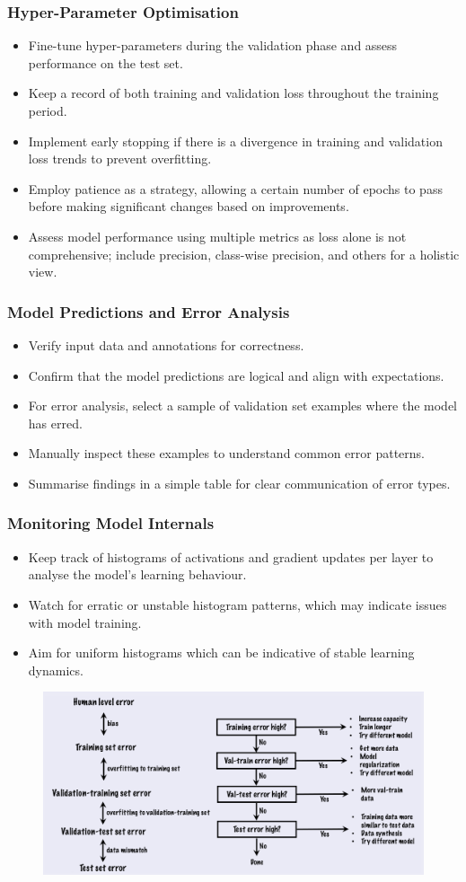 \subsubsection*{Hyper-Parameter Optimisation}
\begin{itemize}
    \item Fine-tune hyper-parameters during the validation phase and assess performance on the test set.
    \item Keep a record of both training and validation loss throughout the training period.
    \item Implement early stopping if there is a divergence in training and validation loss trends to prevent overfitting.
    \item Employ patience as a strategy, allowing a certain number of epochs to pass before making significant changes based on improvements.
    \item Assess model performance using multiple metrics as loss alone is not comprehensive; include precision, class-wise precision, and others for a holistic view.
\end{itemize}

\subsubsection*{Model Predictions and Error Analysis}
\begin{itemize}
    \item Verify input data and annotations for correctness.
    \item Confirm that the model predictions are logical and align with expectations.
    \item For error analysis, select a sample of validation set examples where the model has erred.
    \item Manually inspect these examples to understand common error patterns.
    \item Summarise findings in a simple table for clear communication of error types.
\end{itemize}

\subsubsection*{Monitoring Model Internals}
\begin{itemize}
    \item Keep track of histograms of activations and gradient updates per layer to analyse the model's learning behaviour.
    \item Watch for erratic or unstable histogram patterns, which may indicate issues with model training.
    \item Aim for uniform histograms which can be indicative of stable learning dynamics.
\end{itemize}

\begin{figure}[H]
    \centering
    \includegraphics[width=0.75\linewidth]{img/error_analysis.png}
\end{figure}
